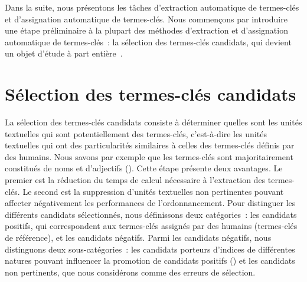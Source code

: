     Dans la suite, nous présentons les tâches d'extraction automatique de
    termes-clés et d'assignation automatique de termes-clés. Nous commençons par
    introduire une étape préliminaire à la plupart des méthodes d'extraction et
    d'assignation automatique de termes-clés~: la sélection des termes-clés
    candidats, qui devient un objet d'étude à part
    entière~\cite{wang2014keyphraseextractionpreprocessing}.


  \section{Sélection des termes-clés candidats}
  \label{sec:main-state_of_the_art-keyphrase_candidate_selection}
    La sélection des termes-clés candidats consiste à déterminer quelles sont
    les unités textuelles qui sont potentiellement des termes-clés, c'est-à-dire
    les unités textuelles qui ont des particularités similaires à celles des
    termes-clés définis par des humains. Nous savons par exemple que les
    termes-clés sont majoritairement constitués de noms et d'adjectifs
    (). Cette étape présente deux avantages. Le premier est la
    réduction du temps de calcul nécessaire à l'extraction des  termes-clés. Le
    second est la suppression d'unités textuelles non pertinentes pouvant
    affecter négativement les performances de l'ordonnancement. Pour distinguer
    les différents candidats sélectionnés, nous définissons deux catégories~:
    les candidats positifs, qui correspondent aux termes-clés
    assignés par des humains (termes-clés de référence), et les candidats
    négatifs. Parmi les candidats négatifs, nous distinguons deux
    sous-catégories~: les candidats porteurs d'indices de
    différentes natures pouvant influencer la promotion de candidats positifs
    () et les candidats non pertinents,
    que nous considérons comme des erreurs de sélection.

